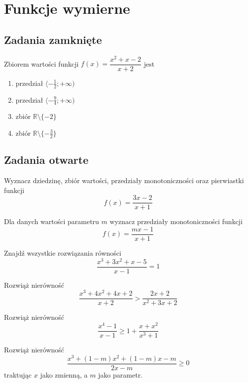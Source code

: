 \setcounter{parc}{0}
\addtocounter{chapc}{1}

\chapter{Funkcje wymierne}

\section{Zadania zamknięte}

\zadanie Zbiorem wartości funkcji $f(x) = \dfrac{x^2 + x - 2}{x + 2}$ jest
\begin{enumerate}[label=\alph*)]
	\item przedział $ \langle -\frac{1}{2}; +\infty ) $
	\item przedział $ \langle -\frac{9}{4}; +\infty ) $
	\item zbiór $\mathbb{R} \setminus \{-2\}$ %
	\item zbiór $\mathbb{R} \setminus \{-\frac{3}{2}\}$
\end{enumerate}

\section{Zadania otwarte}

\zadanie Wyznacz dziedzinę, zbiór wartości, przedziały monotoniczności oraz pierwiastki funkcji \[ f(x) = \dfrac{3x - 2}{x + 1} \]

\zadanie Dla danych wartości parametru $m$ wyznacz przedziały monotoniczności funkcji \[ f(x) = \dfrac{mx - 1}{x + 1} \]

\zadanie Znajdź wszystkie rozwiązania równości \[ \dfrac{x^3 + 3x^2 + x - 5}{x - 1} = 1 \] %

\zadanie Rozwiąż nierówność \[ \dfrac{x^3 + 4x^2 + 4x + 2}{x + 2} > \dfrac{2x + 2}{x^2 + 3x + 2}\] %

\zadanie Rozwiąż nierówność \[ \dfrac{x^4 - 1}{x - 1} \geqslant 1 + \dfrac{x + x^2}{x^3 + 1} \] %

\zadanie Rozwiąż nierówność \[  \dfrac{x^3 + (1 - m)x^2 + (1 - m)x - m}{2x - m} \geqslant 0 \] traktując $x$ jako zmienną, a $m$ jako parametr.

